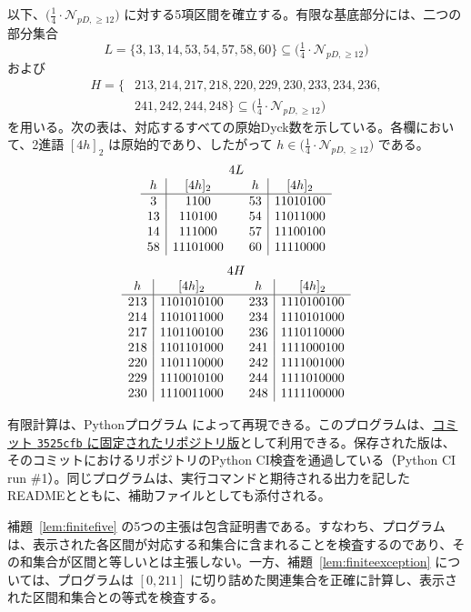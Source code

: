 \documentclass[12pt]{ltjsarticle}
\theoremstyle{plain}
\theoremstyle{definition}
\theoremstyle{plain}
\newcommand{\Pset}{
  \bigl(\tfrac{1}{4}\cdot\mathcal{N}_{pD,\geq 12}\bigr)
}
\begin{document}
以下、$\Pset$ に対する5項区間を確立する。有限な基底部分には、二つの部分集合
\begin{equation}\label{eq:L-def}
 L=\{3,13,14,53,54,57,58,60\}\subseteq\Pset
\end{equation}
および
\begin{equation}\label{eq:H-def}
\begin{split}
 H=\{&213,214,217,218,220,229,230,233,234,236,\\
     &241,242,244,248\}\subseteq\Pset
\end{split}
\end{equation}
を用いる。次の表は、対応するすべての原始Dyck数を示している。各欄において、2進語 $[4h]_2$ は原始的であり、したがって $h\in\Pset$ である。
\[
\begin{array}{c|c@{\qquad}c|c}
\multicolumn{4}{c}{4L}\\
h&[4h]_2&h&[4h]_2\\ \hline
3&1100&53&11010100\\
13&110100&54&11011000\\
14&111000&57&11100100\\
58&11101000&60&11110000
\end{array}
\]
\[
\begin{array}{c|c@{\qquad}c|c}
\multicolumn{4}{c}{4H}\\
h&[4h]_2&h&[4h]_2\\ \hline
213&1101010100&233&1110100100\\
214&1101011000&234&1110101000\\
217&1101100100&236&1110110000\\
218&1101101000&241&1111000100\\
220&1101110000&242&1111001000\\
229&1110010100&244&1111010000\\
230&1110011000&248&1111100000
\end{array}
\]

有限計算は、Pythonプログラム  によって再現できる。このプログラムは、\href{https://github.com/growupkuriyama-hub/lean_cfg_project/blob/3525cfb/LeanCfgProject/PrimDyck/verify_certificates_for_paper.py}{コミット \texttt{3525cfb} に固定されたリポジトリ版}として利用できる。保存された版は、そのコミットにおけるリポジトリのPython CI検査を通過している（Python CI run \#1）。同じプログラムは、実行コマンドと期待される出力を記したREADMEとともに、補助ファイルとしても添付される。

補題~\ref{lem:finitefive} の5つの主張は包含証明書である。すなわち、プログラムは、表示された各区間が対応する和集合に含まれることを検査するのであり、その和集合が区間と等しいとは主張しない。一方、補題~\ref{lem:finiteexception} については、プログラムは $[0,211]$ に切り詰めた関連集合を正確に計算し、表示された区間和集合との等式を検査する。
\end{document}
